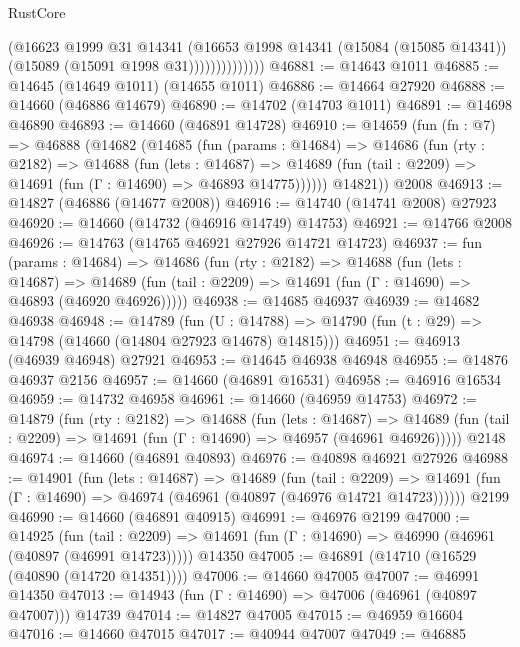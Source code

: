 \begin{lexlean}{RustCore}
\begin{coremodule}
                        (@16623
                          @1999
                          @31
                          @14341
                          (@16653
                            @1998
                            @14341
                            (@15084 (@15085 @14341))
                            (@15089 (@15091 @1998 @31))))))))))))))
@46881 := @14643 @1011
@46885 := @14645 (@14649 @1011) (@14655 @1011)
@46886 := @14664 @27920
@46888 := @14660 (@46886 @14679)
@46890 := @14702 (@14703 @1011)
@46891 := @14698 @46890
@46893 := @14660 (@46891 @14728)
@46910 := @14659
    (fun (fn : @7) =>
    @46888
      (@14682
        (@14685
          (fun (params : @14684) =>
          @14686
            (fun (rty : @2182) =>
            @14688
              (fun (lets : @14687) =>
              @14689 (fun (tail : @2209) => @14691 (fun (Γ : @14690) => @46893 @14775))))))
        @14821))
    @2008
@46913 := @14827 (@46886 (@14677 @2008))
@46916 := @14740 (@14741 @2008) @27923
@46920 := @14660 (@14732 (@46916 @14749) @14753)
@46921 := @14766 @2008
@46926 := @14763 (@14765 @46921 @27926 @14721 @14723)
@46937 := fun (params : @14684) =>
  @14686
    (fun (rty : @2182) =>
    @14688
      (fun (lets : @14687) =>
      @14689 (fun (tail : @2209) => @14691 (fun (Γ : @14690) => @46893 (@46920 @46926)))))
@46938 := @14685 @46937
@46939 := @14682 @46938
@46948 := @14789
    (fun (U : @14788) => @14790 (fun (t : @29) => @14798 (@14660 (@14804 @27923 @14678) @14815)))
@46951 := @46913 (@46939 @46948) @27921
@46953 := @14645 @46938 @46948
@46955 := @14876 @46937 @2156
@46957 := @14660 (@46891 @16531)
@46958 := @46916 @16534
@46959 := @14732 @46958
@46961 := @14660 (@46959 @14753)
@46972 := @14879
    (fun (rty : @2182) =>
    @14688
      (fun (lets : @14687) =>
      @14689 (fun (tail : @2209) => @14691 (fun (Γ : @14690) => @46957 (@46961 @46926)))))
    @2148
@46974 := @14660 (@46891 @40893)
@46976 := @40898 @46921 @27926
@46988 := @14901
    (fun (lets : @14687) =>
    @14689
      (fun (tail : @2209) =>
      @14691 (fun (Γ : @14690) => @46974 (@46961 (@40897 (@46976 @14721 @14723))))))
    @2199
@46990 := @14660 (@46891 @40915)
@46991 := @46976 @2199
@47000 := @14925
    (fun (tail : @2209) => @14691 (fun (Γ : @14690) => @46990 (@46961 (@40897 (@46991 @14723)))))
    @14350
@47005 := @46891 (@14710 (@16529 (@40890 (@14720 @14351))))
@47006 := @14660 @47005
@47007 := @46991 @14350
@47013 := @14943 (fun (Γ : @14690) => @47006 (@46961 (@40897 @47007))) @14739
@47014 := @14827 @47005
@47015 := @46959 @16604
@47016 := @14660 @47015
@47017 := @40944 @47007
@47049 := @46885

\end{coremodule}
\end{lexlean}
